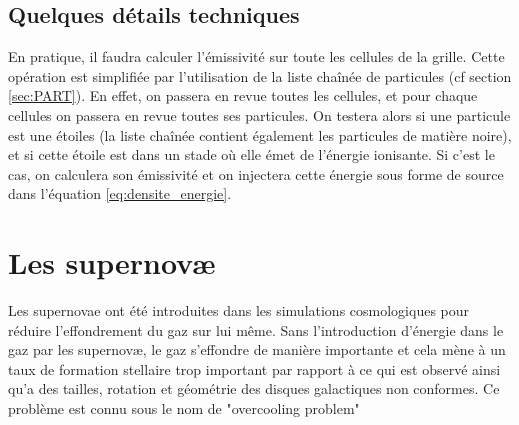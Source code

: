 

\subsection{Quelques détails techniques}

En pratique, il faudra calculer l'émissivité sur toute les cellules de la grille.
Cette opération est simplifiée par l'utilisation de la liste chaînée de particules (cf section \ref{sec:PART}).
En effet, on passera en revue toutes les cellules, et pour chaque cellules on passera en revue toutes ses particules.
On testera alors si une particule est une étoiles (la liste chaînée contient également les particules de matière noire), et si cette étoile est dans un stade où elle émet de l'énergie ionisante.
Si c'est le cas, on calculera son émissivité et on injectera cette énergie sous forme de source dans l'équation \ref{eq:densite_energie}.








%


\section{Les supernovæ}


Les supernovae ont été introduites dans les simulations cosmologiques pour réduire l'effondrement du gaz sur lui même.
Sans l’introduction d’énergie dans le gaz par les supernovæ, le gaz s’effondre de manière importante et cela mène à un taux de formation stellaire trop important par rapport à ce qui est observé ainsi qu’a des tailles, rotation et géométrie des disques galactiques non conformes. Ce problème est connu sous le nom de "overcooling problem" \citep{2003ApJ...599...38B, 1992A&A...264..365B,2003ApJ...599...38B, 1992A&A...264..365B}


